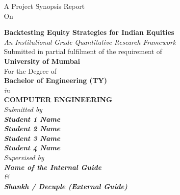 
\begin{titlepage}
\thispagestyle{empty}

{\centering
{A Project Synopsis Report}\\ 
\vspace{0.2cm}
{On}
\vspace{0.4cm}
\\
}
 
{\centering
\large

{\LARGE\bf Backtesting Equity Strategies for Indian Equities}\\
\vspace{0.3cm}
{\large\it An Institutional-Grade Quantitative Research Framework}\\
\vspace{1cm}
{Submitted in partial fulfilment of the requirement of } \\
\vspace{0.2cm}
{\bf{University of Mumbai}} \\
\vspace{0.2cm}
{For the Degree of} \\
\vspace{0.2cm}
{\bf {Bachelor of Engineering (TY) }} \\
{\it{in}} \\
{\bf COMPUTER ENGINEERING } \\
\vspace{0.5cm}
\it{Submitted by} \\
\vspace{.2cm}
\rm
{\large \bf {Student 1 Name}}\\
{\large \bf {Student 2 Name}}\\
{\large \bf {Student 3 Name}}\\
{\large \bf {Student 4 Name}}\\

\vspace{1.2cm}
{\it{Supervised by}} \\
\vspace{.2cm}
\hspace{.05cm} {\large \textbf {Name of the Internal Guide}}\\
\vspace{0.2cm}
{\it{\&}} \\
\vspace{.2cm}
\hspace{.05cm} {\large \textbf {Shankh / Decuple (External Guide)}}\\
\vspace {0.4cm}




}
\end{titlepage}

